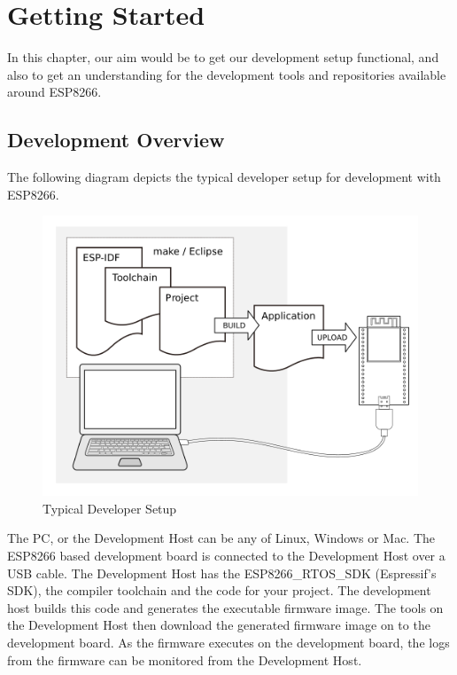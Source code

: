 \documentclass[main.tex]{subfiles}
\begin{document}
\chapter{Getting Started}

In this chapter, our aim would be to get our development setup functional, and also to get an understanding for the development tools and repositories available around ESP8266.

\section{Development Overview}

The following diagram depicts the typical developer setup for development with ESP8266.
\begin{figure}[h]
    \centering
    \includegraphics[scale=0.6]{../../_static/dev_setup.png}
    \caption{Typical Developer Setup}
    \label{fig:dev_setup}
\end{figure}

The PC, or the Development Host can be any of Linux, Windows or Mac. The ESP8266 based development board is connected to the Development Host over a USB cable. The Development Host has the ESP8266\_RTOS\_SDK (Espressif's SDK), the compiler toolchain and the code for your project. The development host builds this code and generates the executable firmware image. The tools on the Development Host then download the generated firmware image on to the development board. As the firmware executes on the development board, the logs from the firmware can be monitored from the Development Host.
\end{document}
